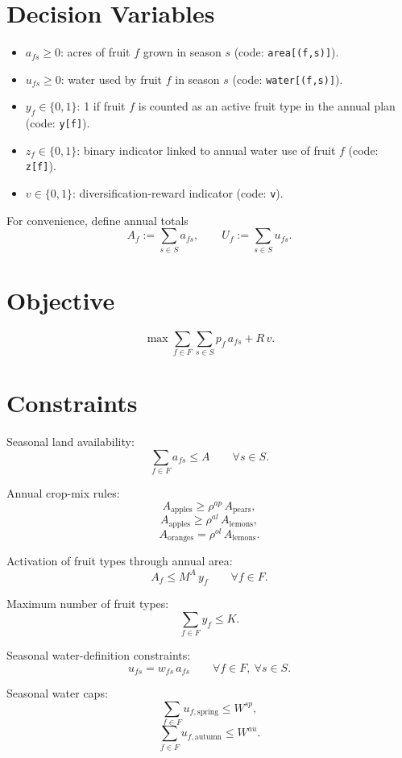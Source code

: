 \section*{Decision Variables}

\begin{itemize}
    \item $a_{fs}\ge 0$: acres of fruit $f$ grown in season $s$ (code: \texttt{area[(f,s)]}).
    \item $u_{fs}\ge 0$: water used by fruit $f$ in season $s$ (code: \texttt{water[(f,s)]}).
    \item $y_f\in\{0,1\}$: 1 if fruit $f$ is counted as an active fruit type in the annual plan (code: \texttt{y[f]}).
    \item $z_f\in\{0,1\}$: binary indicator linked to annual water use of fruit $f$ (code: \texttt{z[f]}).
    \item $v\in\{0,1\}$: diversification-reward indicator (code: \texttt{v}).
\end{itemize}

For convenience, define annual totals
\[
A_f := \sum_{s\in S} a_{fs}, \qquad U_f := \sum_{s\in S} u_{fs}.
\]

\section*{Objective}

\[
\max \sum_{f\in F}\sum_{s\in S} p_f\, a_{fs} + R\, v.
\]

\section*{Constraints}

Seasonal land availability:
\[
\sum_{f\in F} a_{fs} \le A \qquad \forall s\in S.
\]

Annual crop-mix rules:
\[
A_{\text{apples}} \ge \rho^{ap}\, A_{\text{pears}},
\]
\[
A_{\text{apples}} \ge \rho^{al}\, A_{\text{lemons}},
\]
\[
A_{\text{oranges}} = \rho^{ol}\, A_{\text{lemons}}.
\]

Activation of fruit types through annual area:
\[
A_f \le M^A\, y_f \qquad \forall f\in F.
\]

Maximum number of fruit types:
\[
\sum_{f\in F} y_f \le K.
\]

Seasonal water-definition constraints:
\[
u_{fs} = w_{fs}\, a_{fs} \qquad \forall f\in F,\ \forall s\in S.
\]

Seasonal water caps:
\[
\sum_{f\in F} u_{f,\text{spring}} \le W^{sp},
\]
\[
\sum_{f\in F} u_{f,\text{autumn}} \le W^{au}.
\]

